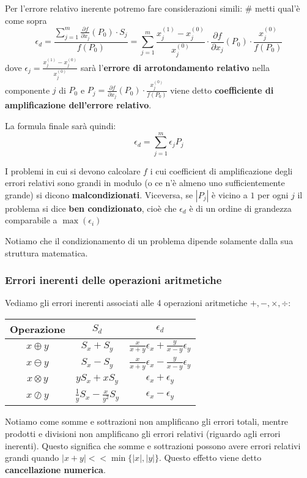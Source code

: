 \documentclass[a4paper,11pt]{article}
\begin{document}
Per l'errore relativo inerente potremo fare considerazioni simili: # metti qual'è come sopra
$$
\epsilon_d = \frac{ \sum_{j=1}^{m} \frac{\partial f}{\partial x_j} (P_0) \cdot S_j }{f(P_0)} = \sum_{j=1}^m \frac{ x_j^{(1)} - x_j^{(0)} }{x_j^{(0)}} \cdot \frac{\partial f}{\partial x_j} (P_0) \cdot \frac{x_j^{(0)}}{f(P_0)}  
$$
dove $\epsilon_j = \frac{ x_j^{(1)} - x_j^{(0)} }{x_j^{(0)}}$ sarà l'\textbf{errore di arrotondamento relativo} nella componente $j$ di $P_0$ e $P_j = \frac{\partial f}{\partial x_j} (P_0) \cdot \frac{x_j^{(0)}}{f(P_0)}$ viene detto \textbf{coefficiente di amplificazione dell'errore relativo}.

La formula finale sarà quindi:
$$
\epsilon_d = \sum_{j=1}^m \epsilon_j P_j
$$

I problemi in cui si devono calcolare $f$ i cui coefficient di amplificazione degli errori relativi sono grandi in modulo (o ce n'è almeno uno sufficientemente grande) si dicono \textbf{malcondizionati}.
Viceversa, se $|P_j|$ è vicino a $1$ per ogni $j$ il problema si dice \textbf{ben condizionato}, cioè che $\epsilon_d$ è di un ordine di grandezza comparabile a $\max(\epsilon_i)$

Notiamo che il condizionamento di un problema dipende solamente dalla sua struttura matematica. 

\subsubsection{Errori inerenti delle operazioni aritmetiche}
Vediamo gli errori inerenti associati alle 4 operazioni aritmetiche $+, -, \times, \div$:
\begin{table}[H]
	\center {}
	\begin{tabular} { c | c | c }
		\bfseries Operazione & $S_d$ & $\epsilon_d$ \\
		\hline
		$x \oplus y$ & $S_x + S_y$ & $\frac{x}{x+y} \epsilon_x + \frac{y}{x - y} \epsilon_y$ \\ 
		$x \ominus y$ & $S_x - S_y$ & $\frac{x}{x+y} \epsilon_x - \frac{y}{x - y} \epsilon_y$ \\ 
		$x \otimes y$ & $yS_x + xS_y$ & $\epsilon_x + \epsilon_y$ \\ 
		$x \oslash y$ & $\frac{1}{y}S_x - \frac{x}{y^2}S_y$ & $\epsilon_x - \epsilon_y$ \\ 
	\end{tabular}
\end{table}

Notiamo come somme e sottrazioni non amplificano gli errori totali, mentre prodotti e divisioni non amplificano gli errori relativi (riguardo agli errori inerenti).
Questo significa che somme e sottrazioni possono avere errori relativi grandi quando $|x + y| << \min \{ |x|, |y|\}$. 
Questo effetto viene detto \textbf{cancellazione numerica}.
\end{document}
